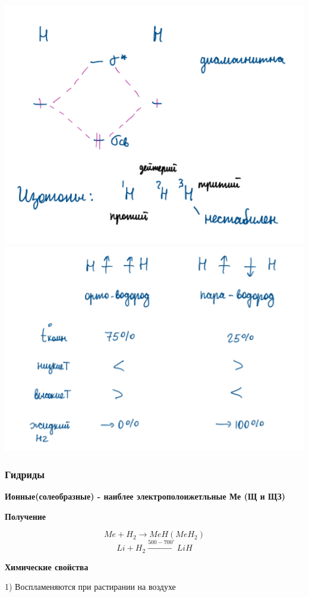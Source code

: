 \includegraphics{images/11v13.png}
\includegraphics[scale=0.95]{images/11v14.png}

\subsubsection*{Гидриды}

\textbf{Ионные(солеобразные) - наиблее электрополоижетльные Ме (Щ и ЩЗ)}

\textbf{Получение}

$$Me + H_2 \rightarrow MeH(MeH_2)$$
$$Li + H_2 \xrightarrow{500-700^{\circ}} LiH$$

\textbf{Химические свойства}

1) Воспламеняются при растирании на воздухе

